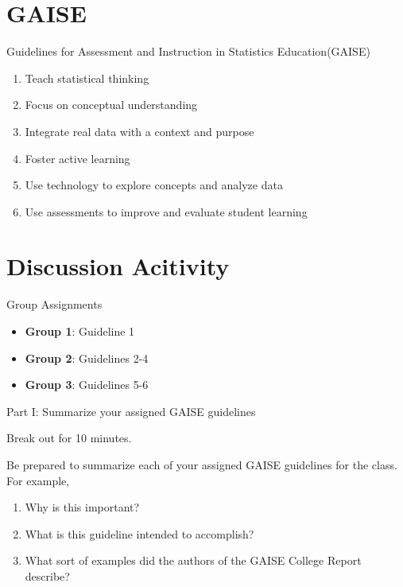 \documentclass[compress]{beamer}
\begin{document}

\section{GAISE}

\begin{frame}{Guidelines for Assessment and Instruction in Statistics Education}{(GAISE)}
  \begin{enumerate}
    \item Teach statistical thinking  
    \item Focus on conceptual understanding
    \item Integrate real data with a context and purpose
    \item Foster active learning
    \item Use technology to explore concepts and analyze data
    \item Use assessments to improve and evaluate student learning
\end{enumerate}
\end{frame}


\section{Discussion Acitivity}

\begin{frame}[fragile]{Group Assignments}
  \begin{itemize}
      \item \textbf{Group 1}: Guideline 1
      \item \textbf{Group 2}: Guidelines 2-4
      \item \textbf{Group 3}: Guidelines 5-6
  \end{itemize}

\end{frame}


\begin{frame}{Part I: Summarize your assigned GAISE guidelines}

Break out for 10 minutes.
\vspace{.5cm}

Be prepared to summarize each of your assigned GAISE guidelines for the class.  For example,
\begin{enumerate}
    \item Why is this important?
    \item What is this guideline intended to accomplish?
    \item What sort of examples did the authors of the GAISE College Report describe?
\end{enumerate}
    
\end{frame}
\end{document}
